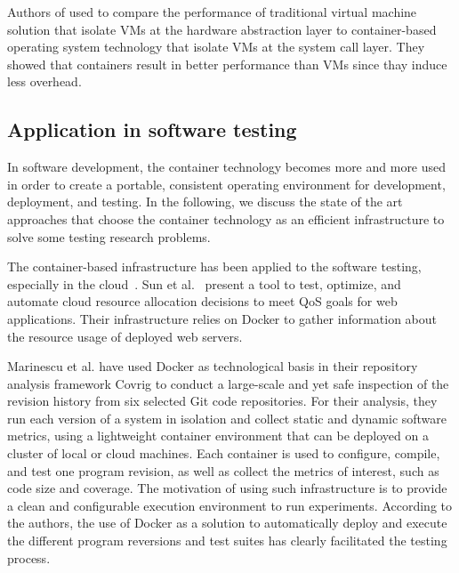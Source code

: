 Authors of \cite{spoiala2016performance,soltesz2007container,merkel2014docker,felter2015updated} used to compare the performance of traditional virtual machine solution that isolate VMs at the hardware abstraction layer to container-based operating system technology that isolate VMs at the system call layer. They showed that containers result in better performance than VMs since thay induce less overhead. 





\subsection{Application in software testing}  
In software development, the container technology becomes more and more used in order to create a portable, consistent operating environment for development, deployment, and testing.
In the following, we discuss the state of the art approaches that choose the container technology as an efficient infrastructure to solve some testing research problems. 

The container-based infrastructure has been applied to the software testing, especially in the cloud~\cite{li2015rest}. Sun et al.~\cite{sun2016roar} present a tool to test, optimize, and automate cloud resource allocation decisions to meet QoS goals for web applications. Their infrastructure relies on Docker to gather information about the resource usage of deployed web servers. 

Marinescu et al.\cite{marinescu2014covrig} have used Docker as technological basis in their repository analysis framework Covrig to conduct a large-scale and yet safe inspection of the revision history from six selected Git code repositories. 
For their analysis, they run each version of a system in isolation and collect static and dynamic software metrics, using a lightweight container environment that can be deployed on a cluster of local or cloud machines. Each container is used to configure, compile, and test one program revision, as well as collect the metrics of interest, such as code size and coverage.
The motivation of using such infrastructure is to provide a clean and configurable execution environment to run experiments. According to the authors, the use of Docker as a solution to automatically deploy and execute the different program reversions and test suites has clearly facilitated the testing process.


